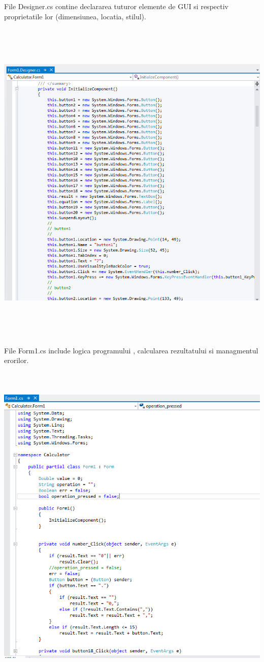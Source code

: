 \documentclass[a4paper, 12pt]{article}
\begin{document}
File Designer.cs contine declararea tuturor elemente de GUI
si respectiv proprietatile lor (dimensiunea, locatia, stilul).

\includegraphics*[width=15cm, height=16cm]{gui_gen}

File Form1.cs include logica programului , calcularea rezultatului si managmentul erorilor.

\includegraphics*[width=15cm, height=16cm]{logic_gen}
\end{document}
